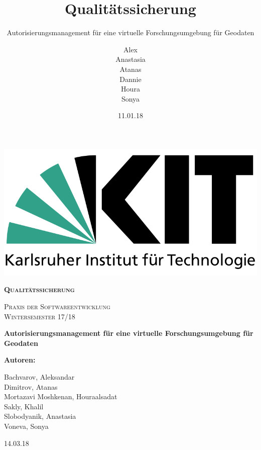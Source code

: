 \documentclass[parskip=full,11pt]{scrartcl}
\title{Qualitätssicherung}
\subtitle{Autorisierungsmanagement für eine virtuelle Forschungsumgebung für Geodaten}
\author{Alex\\Anastasia\\Atanas\\Dannie\\ Houra\\Sonya\\}
\date{11.01.18}
\begin{document}
 
 \begin{titlepage}
 	
 	\begin{center}
 	\includegraphics[width=0.5\linewidth]{res/KITLogo.png}\\
 	\vspace{2cm}
 	{\scshape\LARGE\bfseries Qualitätssicherung \par}
 	\vspace{0.5cm}
 	{\scshape\Large Praxis der Softwareentwicklung\\}
 	\vspace{1cm}
 	{\scshape\Large Wintersemester 17/18\\}
 	\vspace{2cm}
 	{\huge\bfseries Autorisierungsmanagement für eine virtuelle Forschungsumgebung für Geodaten\par}
 	\vspace{2cm}
 	\vfill
 	{\bfseries {\Large Autoren}:\par}
 	{\Large Bachvarov, Aleksandar }\\
 	{\Large Dimitrov, Atanas }\\
 	{\Large Mortazavi Moshkenan, Houraalsadat }\\
 	{\Large Sakly, Khalil }\\
 	{\Large Slobodyanik, Anastasia }\\
 	{\Large Voneva, Sonya}\\
 	\vfill
 	{\large 14.03.18 \par}
 	\end{center}
 \end{titlepage}
 
 \tableofcontents
 \newpage
\end{document}
